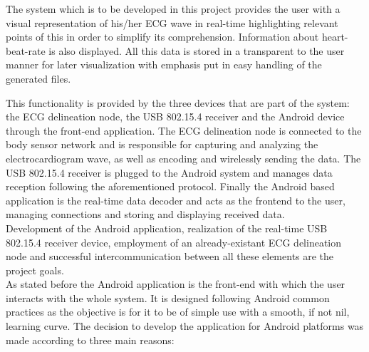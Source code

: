 		The system which is to be developed in this project provides the user with a visual representation of his/her ECG wave in real-time highlighting relevant points of this in order to simplify its comprehension. Information about heart-beat-rate %
		is also displayed. All this data is stored in a transparent to the user manner for later visualization with emphasis put in easy handling of the generated files.\\

		\begin{comment}
		¿Qué es cada parte?
		Sistema 3 partes: nodo delineador, receptor 802.15.4 y app como frontend en general. En un parrafo distino para cada una explicar las tecnologías que hemos usado y porque. 

		¿Cómo se hizo cada parte?
		(Orden, android ->shimmer->msp430->dirigir texto hacia investigación(flecha = parrafo))
		Visualizador: Android ampliamente usado, facilidad para obtener un dispositivo, no demasiado coste (al menos < iOS), plataforma abierta, desarrollo comodo.
		Shimmer: reutiliza sistema desarrollado por la complu en colaboración con EPFL
		Receptor: 

		\end{comment}
		This functionality is provided by the three devices that are part of the system: the ECG delineation node, the USB 802.15.4 receiver and the Android device through the front-end application. The ECG delineation node is connected to the body sensor network and is responsible for capturing and analyzing the electrocardiogram wave, as well as encoding and wirelessly sending the data. The USB 802.15.4 receiver is plugged to the Android system and manages data reception following the aforementioned protocol. Finally the Android based application is the real-time data decoder and acts as the frontend to the user, managing connections and storing and displaying received data.\\

		Development of the Android application, realization of the real-time USB 802.15.4 receiver device, employment of an already-existant ECG delineation node and successful intercommunication between all these elements are the project goals.\\
		
		As stated before the Android application is the front-end with which the user interacts with the whole system. It is designed following Android common practices as the objective is for it to be of simple use with a smooth, if not nil, learning curve. The decision to develop the application for Android platforms was made according to three main reasons:\\

